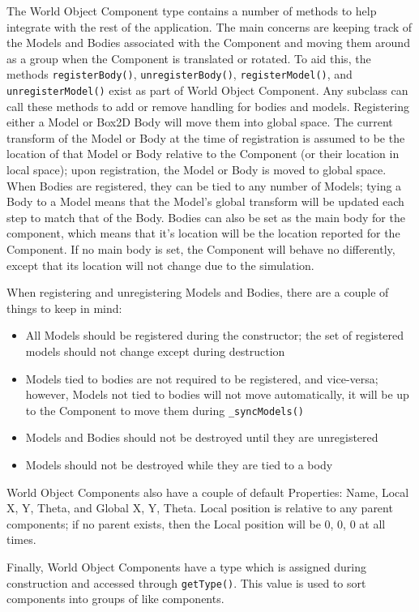 	The World Object Component type contains a number of methods to help integrate with the rest of the application. The main concerns are keeping track of the Models and Bodies associated with the Component and moving them around as a group when the Component is translated
	or rotated. To aid this, the methods \lstinline|registerBody()|, \lstinline|unregisterBody()|, \lstinline|registerModel()|, and \lstinline|unregisterModel()| exist as part of World Object Component. Any subclass can call these methods to add or remove handling for bodies and models. Registering either a Model or Box2D Body will move them into global space. The current transform of the Model or Body at the time of registration is assumed to be the location of that Model or Body relative to the Component (or their location in local space); upon registration, the Model or Body is moved to global space. When Bodies are registered, they can be tied to any number of Models; tying a Body to a Model means that the Model's global transform will be updated each step to match that of the Body. Bodies can also be set as the main body for the component, which means that it's location will be the location reported for the Component. If no main body is set, the Component will behave no differently, except that its location will not change due to the simulation.

	When registering and unregistering Models and Bodies, there are a couple of things to keep in mind:
	\begin{itemize}
		\item All Models should be registered during the constructor; the set of registered models should not change except during destruction
		\item Models tied to bodies are not required to be registered, and vice-versa; however, Models not tied to bodies will not move automatically, it will be up to the Component to move them during \lstinline|_syncModels()|
		\item Models and Bodies should not be destroyed until they are unregistered
		\item Models should not be destroyed while they are tied to a body
	\end{itemize}

	World Object Components also have a couple of default Properties: Name, Local X, Y, Theta, and Global X, Y, Theta. Local position is relative to any parent components; if no parent exists, then the Local position will be 0, 0, 0 at all times.

	Finally, World Object Components have a type which is assigned during construction and accessed through \lstinline|getType()|. This value is used to sort components into groups of like components.
  
